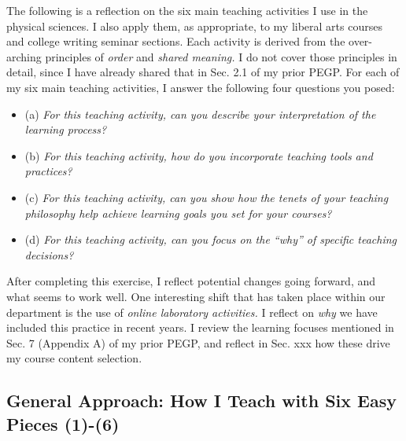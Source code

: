 \documentclass[../../../main.tex]{subfiles}
\begin{document}
The following is a reflection on the six main teaching activities I use in the physical sciences.  I also apply them, as appropriate, to my liberal arts courses and college writing seminar sections.  Each activity is derived from the over-arching principles of \textit{order} and \textit{shared meaning.}  I do not cover those principles in detail, since I have already shared that in Sec. 2.1 of my prior PEGP.  For each of my six main teaching activities, I answer the following four questions you posed:
\begin{itemize}
\item (a) \textit{For this teaching activity, can you describe your interpretation of the learning process?}
\item (b) \textit{For this teaching activity, how do you incorporate teaching tools and practices?}
\item (c) \textit{For this teaching activity, can you show how the tenets of your teaching philosophy help achieve learning goals you set for your courses?}
\item (d) \textit{For this teaching activity, can you focus on the ``why'' of specific teaching decisions?}
\end{itemize} 
After completing this exercise, I reflect potential changes going forward, and what seems to work well.  One interesting shift that has taken place within our department is the use of \textit{online laboratory activities.}  I reflect on \textit{why} we have included this practice in recent years.  I review the learning focuses mentioned in Sec. 7 (Appendix A) of my prior PEGP, and reflect in Sec. xxx how these drive my course content selection.

\subsection{General Approach: How I Teach with Six Easy Pieces (1)-(6)}
\end{document}
